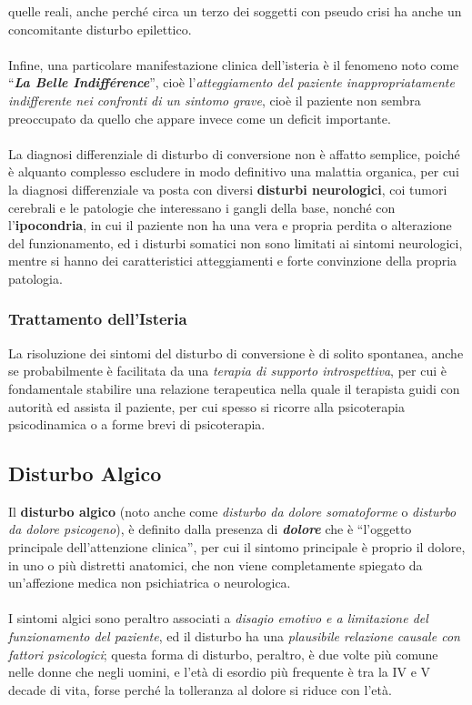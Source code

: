 quelle reali, anche perché circa un terzo dei soggetti con pseudo crisi
ha anche un concomitante disturbo epilettico.
\\\\
Infine, una particolare manifestazione clinica dell'isteria è il
fenomeno noto come ``\textbf{\emph{La Belle Indifférence}}'', cioè
l'\emph{atteggiamento del paziente inappropriatamente indifferente nei
confronti di un sintomo grave}, cioè il paziente non sembra preoccupato
da quello che appare invece come un deficit importante.
\\\\
La diagnosi differenziale di disturbo di conversione non è affatto
semplice, poiché è alquanto complesso escludere in modo definitivo una
malattia organica, per cui la diagnosi differenziale va posta con
diversi \textbf{disturbi neurologici}, coi tumori cerebrali e le
patologie che interessano i gangli della base, nonché con
l'\textbf{ipocondria}, in cui il paziente non ha una vera e propria
perdita o alterazione del funzionamento, ed i disturbi somatici non sono
limitati ai sintomi neurologici, mentre si hanno dei caratteristici
atteggiamenti e forte convinzione della propria patologia.

\subsubsection{Trattamento dell'Isteria}

La risoluzione dei sintomi del disturbo di conversione è di solito
spontanea, anche se probabilmente è facilitata da una \emph{terapia di
supporto introspettiva}, per cui è fondamentale stabilire una relazione
terapeutica nella quale il terapista guidi con autorità ed assista il
paziente, per cui spesso si ricorre alla psicoterapia psicodinamica o a
forme brevi di psicoterapia.

\subsection{Disturbo Algico}

Il \textbf{disturbo algico} (noto anche come \emph{disturbo da dolore
somatoforme} o \emph{disturbo da dolore psicogeno}), è definito dalla
presenza di \textbf{\emph{dolore}} che è ``l'oggetto principale
dell'attenzione clinica'', per cui il sintomo principale è proprio il
dolore, in uno o più distretti anatomici, che non viene completamente
spiegato da un'affezione medica non psichiatrica o neurologica.
\\\\
I sintomi algici sono peraltro associati a \emph{disagio emotivo e a
limitazione del funzionamento del paziente}, ed il disturbo ha una
\emph{plausibile relazione causale con fattori psicologici}; questa
forma di disturbo, peraltro, è due volte più comune nelle donne che
negli uomini, e l'età di esordio più frequente è tra la IV e V decade di
vita, forse perché la tolleranza al dolore si riduce con l'età.


